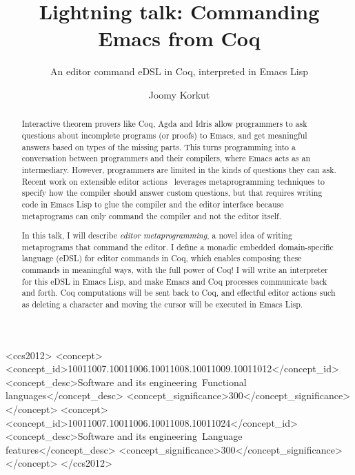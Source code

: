\documentclass[acmlarge]{acmart}
\begin{document}
\title{Lightning talk: Commanding Emacs from Coq}
\subtitle{An editor command eDSL in Coq, interpreted in Emacs Lisp}

\author{Joomy Korkut}

\renewcommand{\shortauthors}{Joomy Korkut}

\begin{abstract}
  Interactive theorem provers like Coq, Agda and Idris allow programmers to
  ask questions about incomplete programs (or proofs) to Emacs, and get
  meaningful answers based on types of the missing parts.
  This turns programming into a conversation between
  programmers and their compilers, where Emacs acts as an intermediary.
  However, programmers are limited in the kinds of questions they can ask.
  Recent work on extensible editor actions~\cite{extensible,rayObt} leverages
  metaprogramming techniques to specify how the compiler should answer
  custom questions, but that requires writing code in Emacs Lisp
  to glue the compiler and the editor interface because
  metaprograms can only command the compiler and not the editor itself.

  \vspace{0.7em}

  \noindent In this talk, I will describe \emph{editor metaprogramming}, a
  novel idea of writing metaprograms that command the editor.
  I define a monadic embedded domain-specific language (eDSL) for editor
  commands in Coq, which enables composing these commands in meaningful ways,
  with the full power of Coq!
  I will write an interpreter for this eDSL in Emacs Lisp, and make Emacs and
  Coq processes communicate back and forth.
  Coq computations will be sent back to Coq,
  and effectful editor actions such as deleting a character
  and moving the cursor will be executed in Emacs Lisp.
\end{abstract}

%
%
\begin{CCSXML}
<ccs2012>
<concept>
<concept_id>10011007.10011006.10011008.10011009.10011012</concept_id>
<concept_desc>Software and its engineering~Functional languages</concept_desc>
<concept_significance>300</concept_significance>
</concept>
<concept>
<concept_id>10011007.10011006.10011008.10011024</concept_id>
<concept_desc>Software and its engineering~Language features</concept_desc>
<concept_significance>300</concept_significance>
</concept>
</ccs2012>
\end{CCSXML}
\end{document}
